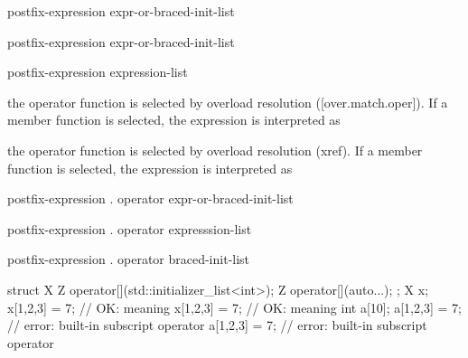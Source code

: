 \documentclass{wg21}
\begin{document}
\begin{removedblock}
\begin{ncsimplebnf}
    postfix-expression \terminal{[} expr-or-braced-init-list \terminal{]}
\end{ncsimplebnf}
\end{removedblock}

\begin{addedblock}
\begin{ncsimplebnf}
    postfix-expression \terminal{[}  expr-or-braced-init-list \terminal{]}

    postfix-expression \terminal{[}  expression-list \terminal{]}
\end{ncsimplebnf}
\end{addedblock}

the operator function is selected by overload resolution ([over.match.oper]).
If a member function is selected, the expression is interpreted as

the operator function
is selected by overload resolution (xref).
If a member function is selected, the expression is
interpreted as

\begin{removedblock}
\begin{ncsimplebnf}
    postfix-expression . operator \terminal{[}\terminal{]} \terminal{(} expr-or-braced-init-list \terminal{)}
\end{ncsimplebnf}
\end{removedblock}

\begin{addedblock}
\begin{ncsimplebnf}
     postfix-expression . operator \terminal{[}\terminal{]} \terminal{(} expresssion-list \terminal{)}

      postfix-expression . operator \terminal{[}\terminal{]} \terminal{(}
      braced-init-list  \terminal{)}
\end{ncsimplebnf}
\end{addedblock}

\pnum
\begin{example}
\begin{codeblock}
    struct X {
        Z operator[](std::initializer_list<int>);
        Z operator[](auto...);
    };
    X x;
    x[{1,2,3}] = 7;                 // OK: meaning 
    x[1,2,3] = 7;                   // OK: meaning 
    int a[10];
    a[{1,2,3}] = 7;                 // error: built-in subscript operator
    a[1,2,3] = 7;                   // error: built-in subscript operator
\end{codeblock}
\end{example}
\end{document}
